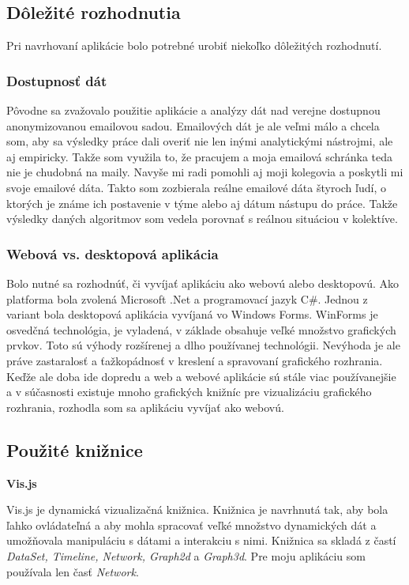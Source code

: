 \documentclass[slovak,master,public,dept460,male,cpdeclaration,oneside]{diploma}
\begin{document}
\subsection{Dôležité rozhodnutia}
Pri navrhovaní aplikácie bolo potrebné urobiť niekoľko dôležitých rozhodnutí.

\subsubsection{Dostupnosť dát}
Pôvodne sa zvažovalo použitie aplikácie a analýzy dát nad verejne dostupnou anonymizovanou emailovou sadou. Emailových dát je ale veľmi málo a chcela som, aby sa výsledky práce dali overiť nie len inými analytickými nástrojmi, ale aj empiricky. Takže som využila to, že pracujem a moja emailová schránka teda nie je chudobná na maily. Navyše mi radi pomohli aj moji kolegovia a poskytli mi svoje emailové dáta. Takto som zozbierala reálne emailové dáta štyroch ľudí, o ktorých je známe ich postavenie v týme alebo aj dátum nástupu do práce. Takže výsledky daných algoritmov som vedela porovnať s reálnou situáciou v kolektíve.

\subsubsection{Webová vs. desktopová aplikácia}
Bolo nutné sa rozhodnúť, či vyvíjať aplikáciu ako webovú alebo desktopovú. Ako platforma bola zvolená Microsoft .Net a programovací jazyk C\#. Jednou z variant bola desktopová aplikácia vyvíjaná vo Windows Forms. WinForms je osvedčná technológia, je vyladená, v základe obsahuje veľké množstvo grafických prvkov. Toto sú výhody rozšírenej a dlho používanej technológii. Nevýhoda je ale práve zastaralosť a ťažkopádnosť v kreslení a spravovaní grafického rozhrania. Keďže ale doba ide dopredu a web a webové aplikácie sú stále viac používanejšie a v súčasnosti existuje mnoho grafických knižníc pre vizualizáciu grafického rozhrania, rozhodla som sa aplikáciu vyvíjať ako webovú.


\subsection{Použité knižnice}


\textbf{Vis.js}


Vis.js je dynamická vizualizačná knižnica. Knižnica je navrhnutá tak, aby bola ľahko ovládateľná a aby mohla spracovať veľké množstvo dynamických dát a umožňovala manipuláciu s dátami a interakciu s nimi. Knižnica sa skladá z častí \textit{DataSet, Timeline, Network, Graph2d} a \textit{Graph3d}.
Pre moju aplikáciu som používala len časť \textit{Network}.
\end{document}
